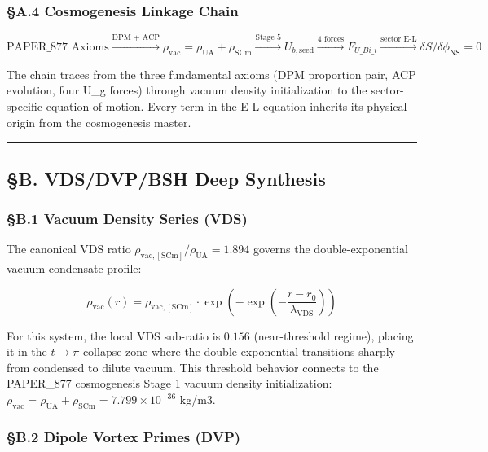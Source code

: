 \subsubsection{§A.4 Cosmogenesis Linkage
Chain}\label{a.4-cosmogenesis-linkage-chain}

\[\text{PAPER\_877 Axioms} \xrightarrow{\text{DPM + ACP}} \rho_{\mathrm{vac}} = \rho_{\mathrm{UA}} + \rho_{\mathrm{SCm}} \xrightarrow{\text{Stage 5}} U_{b,\mathrm{seed}} \xrightarrow{\text{4 forces}} F_{U\_Bi\_i} \xrightarrow{\text{sector E-L}} \delta S/\delta \phi_{\mathrm{NS}} = 0\]

The chain traces from the three fundamental axioms (DPM proportion pair,
ACP evolution, four U\_g forces) through vacuum density initialization
to the sector-specific equation of motion. Every term in the E-L
equation inherits its physical origin from the cosmogenesis master.

\begin{center}\rule{0.5\linewidth}{0.5pt}\end{center}

\subsection{§B. VDS/DVP/BSH Deep
Synthesis}\label{b.-vdsdvpbsh-deep-synthesis}

\subsubsection{§B.1 Vacuum Density Series
(VDS)}\label{b.1-vacuum-density-series-vds}

The canonical VDS ratio
\(\rho_{\mathrm{vac,[SCm]}} / \rho_{\mathrm{UA}} = 1.894\) governs the
double-exponential vacuum condensate profile:

\[\rho_{\mathrm{vac}}(r) = \rho_{\mathrm{vac,[SCm]}} \cdot \exp\!\left(-\exp\!\left(-\frac{r - r_0}{\lambda_{\mathrm{VDS}}}\right)\right)\]

For this system, the local VDS sub-ratio is \(0.156\) (near-threshold
regime), placing it in the \(t \to \pi\) collapse zone where the
double-exponential transitions sharply from condensed to dilute vacuum.
This threshold behavior connects to the PAPER\_877 cosmogenesis Stage 1
vacuum density initialization:
\(\rho_{\mathrm{vac}} = \rho_{\mathrm{UA}} + \rho_{\mathrm{SCm}} = 7.799 \times 10^{-36}\)
kg/m3.

\subsubsection{§B.2 Dipole Vortex Primes
(DVP)}\label{b.2-dipole-vortex-primes-dvp}

